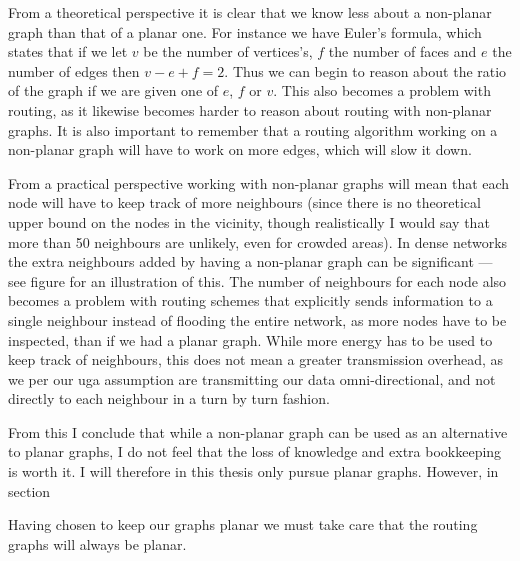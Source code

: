 From a theoretical perspective it is clear that we know less about a non-planar graph than that of a planar one. For instance we have Euler's formula, which states that if we let $v$ be the number of vertices's, $f$ the number of faces and $e$ the number of edges then $v - e + f = 2$. Thus we can begin to reason about the ratio of the graph if we are given one of $e$, $f$ or $v$. This also becomes a problem with routing, as it likewise becomes harder to reason about routing with non-planar graphs. It is also important to remember that a routing algorithm working on a non-planar graph will have to work on more edges, which will slow it down.

From a practical perspective working with non-planar graphs will mean that each node will have to keep track of more neighbours (since there is no theoretical upper bound on the nodes in the vicinity, though realistically I would say that more than 50 neighbours are unlikely, even for crowded areas). In dense networks the extra neighbours added by having a non-planar graph can be significant --- see figure  for an illustration of this. The number of neighbours for each node also becomes a problem with routing schemes that explicitly sends information to a single neighbour instead of flooding the entire network, as more nodes have to be inspected, than if we had a planar graph. While more energy has to be used to keep track of neighbours, this does not mean a greater transmission overhead, as we per our \ac{uga} assumption are transmitting our data omni-directional, and not directly to each neighbour in a turn by turn fashion.

From this I conclude that while a non-planar graph can be used as an alternative to planar graphs, I do not feel that the loss of knowledge and extra bookkeeping is worth it. I will therefore in this thesis only pursue planar graphs. However, in section
 
Having chosen to keep our graphs planar we must take care that the routing graphs will always be planar.


